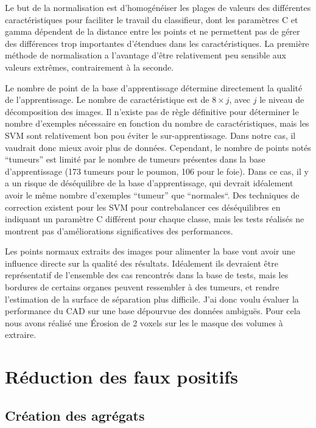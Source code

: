 Le but de la normalisation est d'homogénéiser les plages de valeurs des différentes caractéristiques pour faciliter le travail du classifieur, dont les paramètres C et gamma dépendent de la distance entre les points et ne permettent pas de gérer des différences trop importantes d'étendues dans les caractéristiques. La première méthode de normalisation a l'avantage d'être relativement peu sensible aux valeurs extrêmes, contrairement à la seconde.

Le nombre de point de la base d'apprentissage détermine directement la qualité de l'apprentissage. Le nombre de caractéristique est de $8 \times j$, avec $j$ le niveau de décomposition des images. Il n'existe pas de règle définitive pour déterminer le nombre d'exemples nécessaire en fonction du nombre de caractéristiques, mais les SVM sont relativement bon pou éviter le sur-apprentissage. Dans notre cas, il vaudrait donc mieux avoir plus de données. Cependant, le nombre de points notés ``tumeurs'' est limité par le nombre de tumeurs présentes dans la base d'apprentissage (173 tumeurs pour le poumon, 106 pour le foie). Dans ce cas, il y a un risque de déséquilibre de la base d'apprentissage, qui devrait idéalement avoir le même nombre d'exemples ``tumeur'' que ``normales``. Des techniques de correction existent pour les SVM pour contrebalancer ces déséquilibres en indiquant un paramètre C différent pour chaque classe, mais les tests réalisés ne montrent pas d'améliorations significatives des performances.

Les points normaux extraits des images pour alimenter la base vont avoir une influence directe sur la qualité des résultats. Idéalement ils devraient être représentatif de l'ensemble des cas rencontrés dans la base de tests, mais les bordures de certains organes peuvent ressembler à des tumeurs, et rendre l'estimation de la surface de séparation plus difficile. J'ai donc voulu évaluer la performance du CAD sur une base dépourvue des données ambiguës. Pour cela nous avons réalisé une Érosion de 2 voxels sur les le masque des volumes à extraire.

\section{Réduction des faux positifs}

\subsection{Création des agrégats}

